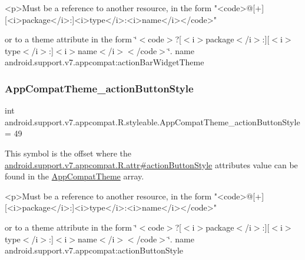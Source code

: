 \begin{DoxyVerb}      <p>Must be a reference to another resource, in the form "<code>@[+][<i>package</i>:]<i>type</i>:<i>name</i></code>"
\end{DoxyVerb}
 or to a theme attribute in the form \char`\"{}$<$code$>$?\mbox{[}$<$i$>$package$<$/i$>$\+:\mbox{]}\mbox{[}$<$i$>$type$<$/i$>$\+:\mbox{]}$<$i$>$name$<$/i$>$$<$/code$>$\char`\"{}.  name android.\+support.\+v7.\+appcompat\+:action\+Bar\+Widget\+Theme \mbox{\label{classandroid_1_1support_1_1v7_1_1appcompat_1_1R_1_1styleable_aed2e837f0d6e11a7654cf7d92cff7596}} 
\subsubsection{\texorpdfstring{App\+Compat\+Theme\+\_\+action\+Button\+Style}{AppCompatTheme\_actionButtonStyle}}
{\footnotesize\ttfamily int android.\+support.\+v7.\+appcompat.\+R.\+styleable.\+App\+Compat\+Theme\+\_\+action\+Button\+Style = 49\hspace{0.3cm}{\ttfamily [static]}}

This symbol is the offset where the \hyperlink{classandroid_1_1support_1_1v7_1_1appcompat_1_1R_1_1attr_a3a9c65c5f489ade11715a890bcb6817d}{android.\+support.\+v7.\+appcompat.\+R.\+attr\#action\+Button\+Style} attribute\textquotesingle{}s value can be found in the \hyperlink{classandroid_1_1support_1_1v7_1_1appcompat_1_1R_1_1styleable_a5c42f89e8a410c323be34208d75c430b}{App\+Compat\+Theme} array.

\begin{DoxyVerb}      <p>Must be a reference to another resource, in the form "<code>@[+][<i>package</i>:]<i>type</i>:<i>name</i></code>"
\end{DoxyVerb}
 or to a theme attribute in the form \char`\"{}$<$code$>$?\mbox{[}$<$i$>$package$<$/i$>$\+:\mbox{]}\mbox{[}$<$i$>$type$<$/i$>$\+:\mbox{]}$<$i$>$name$<$/i$>$$<$/code$>$\char`\"{}.  name android.\+support.\+v7.\+appcompat\+:action\+Button\+Style \mbox{\label{classandroid_1_1support_1_1v7_1_1appcompat_1_1R_1_1styleable_abba2b1805131f8a438a2d7071f72f61c}} 

